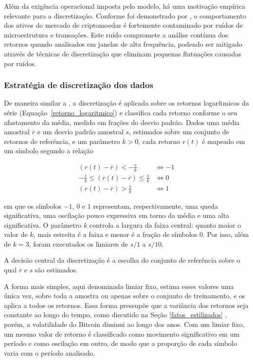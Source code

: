 \documentclass[
    12pt,                %
    openright,           %
    oneside,             %
    a4paper,             %
    english,             %
    brazil               %
]{abntex2}
\begin{document}
Além da exigência operacional imposta pelo modelo, há uma motivação empírica relevante para a discretização.
Conforme foi demonstrado por , o comportamento dos ativos do mercado de criptomoedas é fortemente
contaminado por ruídos de microestrutura e transações. Este ruído compromete a análise contínua dos retornos quando analisados
em janelas de alta frequência, podendo ser mitigado através de técnicas de discretização que eliminam pequenas flutuações causadas
por ruídos.

\subsubsection{Estratégia de discretização dos dados}
\label{discretizacao}

De maneira similar a , a discretização é aplicada sobre os retornos logarítmicos da série 
(Equação~\ref{retorno_logaritmico}) e classifica cada retorno conforme o seu afastamento da média, medido em 
frações do desvio padrão. Dados uma média amostral $\overline{r}$ e um desvio padrão amostral $s$, 
estimados sobre um conjunto de retornos de referência, e um parâmetro $k > 0$, cada retorno $r(t)$ é mapeado 
em um símbolo segundo a relação

\begin{equation}
    \begin{aligned}
        \left( r(t) - \overline{r} \right) < -\frac{s}{k} &\iff -1 \\
        -\frac{s}{k} \leq \left( r(t) - \overline{r} \right) \leq \frac{s}{k} &\iff 0 \\
        \left( r(t) - \overline{r} \right) > \frac{s}{k} &\iff 1
    \end{aligned}
    \label{discretizacao_eq}
\end{equation}

em que os símbolos $-1$, $0$ e $1$ representam, respectivamente, uma queda significativa, uma oscilação pouco expressiva em 
torno da média e uma alta significativa. O parâmetro $k$ controla a largura da faixa central: quanto maior o valor de $k$, 
mais estreita é a faixa e menor é a fração de símbolos $0$. Por isso, além de $k = 3$, foram executados os limiares de $s/1$ a $s/10$.

A decisão central da discretização é a escolha do conjunto de referência sobre o qual $\overline{r}$ e $s$ são estimados. 

A forma mais simples, aqui denominada limiar fixo, estima esses valores uma única vez, sobre toda a amostra ou apenas 
sobre o conjunto de treinamento, e os aplica a todos os retornos. Essa forma pressupõe que a variância dos retornos seja 
constante ao longo do tempo, como discutido na Seção \ref{fatos_estilizados} \cite{morettin2018analise}, porém, 
a volatilidade do Bitcoin diminui ao longo dos anos. Com um limiar fixo, um mesmo valor de retorno é classificado como movimento 
significativo em um período e como oscilação em outro, de modo que a proporção de cada símbolo varia com o período analisado. 
\end{document}
